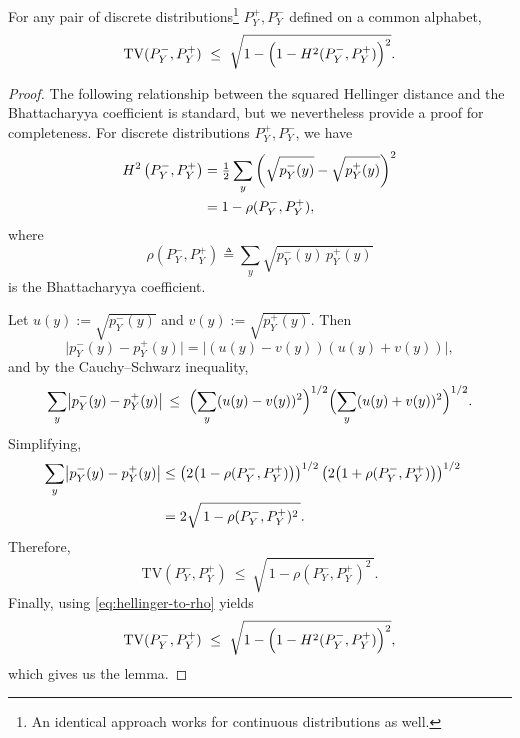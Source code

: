\documentclass[10pt,a4paper]{amsart}
\begin{document}
\begin{lemma}\label{lem:bound_tv_sqhellinger}
For any pair of discrete distributions\footnote{An identical approach works for continuous distributions as well.} $P_{Y}^+,P_{Y}^-$ defined on a common alphabet,
\[
\mathrm{TV}(P_Y^-,P_Y^+)
\ \le\ \sqrt{1 - \Bigl(1 - H^2(P_Y^-,P_Y^+)\Bigr)^2}.
\]
\end{lemma}

\begin{proof}
The following relationship between the squared Hellinger distance and the Bhattacharyya coefficient is standard, but we nevertheless provide a proof for completeness. For discrete distributions $P_Y^+,P_{Y}^-$, we have
\begin{align}
H^2 \left(P_Y^-,P_Y^+\right)
&= \tfrac{1}{2}\sum_{y} \left(\sqrt{p_Y^-(y)} - \sqrt{p_Y^+(y)}\right)^2   \notag\\
&= 1 - \rho(P_Y^-,P_Y^+), \label{eq:hellinger-to-rho}
\end{align}
where
\[
\rho(P_Y^-,P_Y^+) \triangleq \sum_y\sqrt{p_Y^-(y)\,p_Y^+(y)}
\]
is the Bhattacharyya coefficient.

Let \(u(y) := \sqrt{p_Y^-(y)}\) and \(v(y) := \sqrt{p_Y^+(y)}\).  
Then
\[
\bigl|p_Y^-(y) - p_Y^+(y)\bigr| = |(u(y) - v(y))(u(y) + v(y))|,
\]
and by the Cauchy--Schwarz inequality,
\[
\sum_y \bigl|p_Y^-(y) - p_Y^+(y)\bigr| \, 
 \le\ \Bigl(\sum_y (u(y) - v(y))^2 \Bigr)^{1/2}
       \Bigl(\sum_y (u(y) + v(y))^2 \Bigr)^{1/2}.
\]
Simplifying,
\begin{align}
    \sum_y \bigl|p_Y^-(y) - p_Y^+(y)\bigr|  &\le \left( 2\bigl(1 - \rho(P_Y^-,P_Y^+)\bigr) \right)^{1/2} \left(  2\bigl(1 + \rho(P_Y^-,P_Y^+)\bigr)\right)^{1/2} &\notag\\
    &=2\sqrt{\,1 - \rho(P_Y^-,P_Y^+)^2\,}.
\end{align}
Therefore,
\[
\mathrm{TV}(P_Y^-,P_Y^+)
\ \le\ \sqrt{\,1 - \rho(P_Y^-,P_Y^+)^2\,}.
\]
Finally, using \eqref{eq:hellinger-to-rho} yields
\[
\mathrm{TV}(P_Y^-,P_Y^+)
\ \le\ \sqrt{1 - \Bigl(1 - H^2(P_Y^-,P_Y^+)\Bigr)^2},
\]
which gives us the lemma.  
\end{proof}
\end{document}
